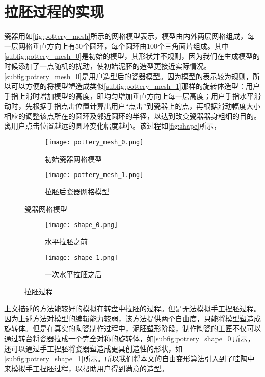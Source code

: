 \section{拉胚过程的实现}

瓷器用如\autoref{fig:pottery_mesh}所示的网格模型表示，模型由内外两层网格组成，每一层网格垂直方向上有50个圆环，每个圆环由100个三角面片组成。其中\autoref{subfig:pottery_mesh_0}是初始的模型，其形状并不规则，因为我们在生成模型的时候添加了一点随机的扰动，使初始泥胚的造型更接近实际情况。\autoref{subfig:pottery_mesh_0}是用户造型后的瓷器模型。因为模型的表示较为规则，所以可以方便的将模型塑造成类似\autoref{subfig:pottery_mesh_1}那样的旋转体造型：用户手指上滑时增加模型的高度，即均匀增加垂直方向上每一层高度；用户手指水平滑动时，先根据手指点击位置计算出用户“点击”到瓷器上的点，再根据滑动幅度大小相应的调整该点所在的圆环及邻近圆环的半径，以达到改变瓷器器身粗细的目的。离用户点击位置越远的圆环变化幅度越小。该过程如\autoref{fig:shape}所示，

\begin{figure}[htbp]
	\centering
	\begin{subfigure}[b]{.4\textwidth}
		\centering
	    \texttt{[image: pottery\_mesh\_0.png]}
		\caption{初始瓷器网格模型}\label{subfig:pottery_mesh_0}
	\end{subfigure}
	\begin{subfigure}[b]{.4\textwidth}
		\centering
		\texttt{[image: pottery\_mesh\_1.png]}
		\caption{拉胚后瓷器网格模型}\label{subfig:pottery_mesh_1}
	\end{subfigure}
	\caption{瓷器网格模型}\label{fig:pottery_mesh}
\end{figure}

\begin{figure}[htbp]
	\centering
	\begin{subfigure}[b]{.4\textwidth}
		\centering
	    \texttt{[image: shape\_0.png]}
		\caption{水平拉胚之前}\label{subfig:shape_0}
	\end{subfigure}
	\begin{subfigure}[b]{.4\textwidth}
		\centering
		\texttt{[image: shape\_1.png]}
		\caption{一次水平拉胚之后}\label{subfig:shape_1}
	\end{subfigure}
	\caption{拉胚过程}\label{fig:shape}
\end{figure}

上文描述的方法能较好的模拟在转盘中拉胚的过程。但是无法模拟手工捏胚过程。因为上述方法对模型的编辑能力较弱，该方法提供两个自由度，只能将模型塑造成旋转体。但是在真实的陶瓷制作过程中，泥胚塑形阶段，制作陶瓷的工匠不仅可以通过转台将瓷器拉成一个完全对称的旋转体，如\autoref{subfig:pottery_shape_0}所示，还可以通过手工捏胚将瓷器塑造成更具创造性的形状，如\autoref{subfig:pottery_shape_1}所示。所以我们将本文的自由变形算法引入到了哇陶中来模拟手工捏胚过程，以帮助用户得到满意的造型。

